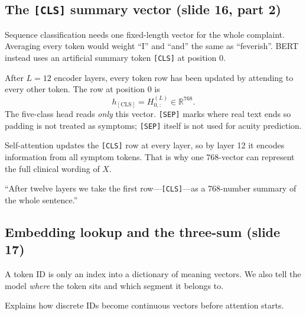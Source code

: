 \subsection{The \texttt{[CLS]} summary vector (slide 16, part 2)}
\label{sec:expl-cls}

\begin{intuitbox}
Sequence classification needs one fixed-length vector for the whole complaint.
Averaging every token would weight ``I'' and ``and'' the same as ``feverish''.
BERT instead uses an artificial summary token \texttt{[CLS]} at position \(0\).
\end{intuitbox}

After \(L=12\) encoder layers, every token row has been updated by attending to every other token.
The row at position \(0\) is
\begin{equation}
  h_{\mathrm{[CLS]}} = H^{(L)}_{0,:} \in \mathbb{R}^{768}.
  \label{eq:hcls}
\end{equation}
The five-class head reads \emph{only} this vector. \texttt{[SEP]} marks where real text ends so padding is not treated as symptoms; \texttt{[SEP]} itself is not used for acuity prediction.

\begin{remark}
Self-attention updates the \texttt{[CLS]} row at every layer, so by layer 12 it encodes information from all symptom tokens. That is why one 768-vector can represent the full clinical wording of \(X\).
\end{remark}

\begin{saybox}
``After twelve layers we take the first row---\texttt{[CLS]}---as a 768-number summary of the whole sentence.''
\end{saybox}

\subsection{Embedding lookup and the three-sum (slide 17)}
\label{sec:expl-embed}

\begin{intuitbox}
A token ID is only an index into a dictionary of meaning vectors.
We also tell the model \emph{where} the token sits and which segment it belongs to.
\end{intuitbox}

\begin{whybox}
Explains how discrete IDs become continuous vectors before attention starts.
\end{whybox}

